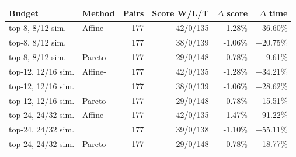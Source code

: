\begin{tabular}{llrrrr}
\toprule
Budget & Method & Pairs & Score W/L/T & $\Delta$ score & $\Delta$ time \\
\midrule
top-8, 8/12 sim. & Affine-\method{} & 177 & 42/0/135 & -1.28\% & +36.60\% \\
top-8, 8/12 sim. & \method{} & 177 & 38/0/139 & -1.06\% & +20.75\% \\
top-8, 8/12 sim. & Pareto-\method{} & 177 & 29/0/148 & -0.78\% & +9.61\% \\
top-12, 12/16 sim. & Affine-\method{} & 177 & 42/0/135 & -1.28\% & +34.21\% \\
top-12, 12/16 sim. & \method{} & 177 & 38/0/139 & -1.06\% & +28.62\% \\
top-12, 12/16 sim. & Pareto-\method{} & 177 & 29/0/148 & -0.78\% & +15.51\% \\
top-24, 24/32 sim. & Affine-\method{} & 177 & 42/0/135 & -1.47\% & +91.22\% \\
top-24, 24/32 sim. & \method{} & 177 & 39/0/138 & -1.10\% & +55.11\% \\
top-24, 24/32 sim. & Pareto-\method{} & 177 & 29/0/148 & -0.78\% & +18.77\% \\
\bottomrule
\end{tabular}
